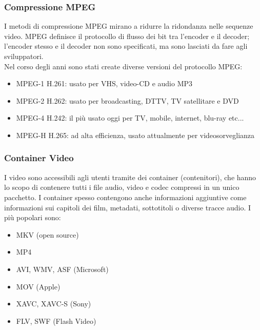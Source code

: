 \documentclass[a4paper,11pt]{article} %
\begin{document}
\subsubsection{Compressione MPEG}
I metodi di compressione MPEG mirano a ridurre la ridondanza nelle sequenze video. MPEG definisce il protocollo di flusso dei bit tra l'encoder e il decoder; l'encoder stesso e il decoder non sono specificati, ma sono lasciati da fare agli sviluppatori. \\
Nel corso degli anni sono stati create diverse versioni del protocollo MPEG:
\begin{itemize}
\item MPEG-1 H.261: usato per VHS, video-CD e audio MP3
\item MPEG-2 H.262: usato per broadcasting, DTTV, TV satellitare e DVD
\item MPEG-4 H.242: il più usato oggi per TV, mobile, internet, blu-ray etc...
\item MPEG-H H.265: ad alta efficienza, usato attualmente per videosorveglianza
\end{itemize}

\subsubsection{Container Video}
I video sono accessibili agli utenti tramite dei container (contenitori), che hanno lo scopo di contenere tutti i file audio, video e codec compressi in un unico pacchetto. I container spesso contengono anche informazioni aggiuntive come informazioni sui capitoli dei film, metadati, sottotitoli o diverse tracce audio. I più popolari sono: 
\begin{itemize}
\item MKV (open source)
\item MP4 
\item AVI, WMV, ASF (Microsoft)
\item MOV (Apple)
\item XAVC, XAVC-S (Sony)
\item FLV, SWF (Flash Video)
\end{itemize}
\end{document}
